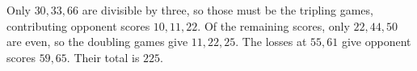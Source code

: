 Only $30,33,66$ are divisible by three, so those must be the tripling games, contributing opponent scores $10,11,22$. Of the remaining scores, only $22,44,50$ are even, so the doubling games give $11,22,25$. The losses at $55,61$ give opponent scores $59,65$. Their total is $\boxed{225}$.
